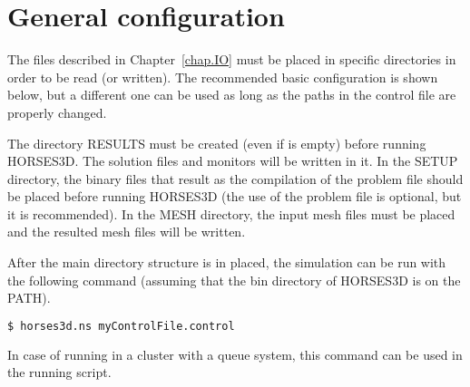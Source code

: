 \documentclass[a4paper,10pt]{report}
\begin{document}
\section{General configuration}
The files described in Chapter~\ref{chap.IO} must be placed in specific directories in order to be read (or written). The recommended basic configuration is shown below, but a different one can be used as long as the paths in the control file are properly changed.

\vspace{0.2 in}

\vspace{0.2 in}
The directory RESULTS must be created (even if is empty) before running HORSES3D. The solution files and monitors will be written in it. In the SETUP directory, the binary files that result as the compilation of the problem file should be placed before running HORSES3D (the use of the problem file is optional, but it is recommended). In the MESH directory, the input mesh files must be placed and the resulted mesh files will be written.

After the main directory structure is in placed, the simulation can be run with the following command (assuming that the bin directory of HORSES3D is on the PATH).

\begin{lstlisting}[language=bash]
	$ horses3d.ns myControlFile.control
\end{lstlisting}

In case of running in a cluster with a queue system, this command can be used in the running script.



\end{document}
